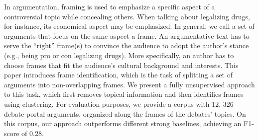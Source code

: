 In argumentation, framing is used to emphasize a specific aspect of a controversial topic while concealing others. When talking about legalizing drugs, for instance, its economical aspect may be emphasized. In general, we call a set of arguments that focus on the same aspect a frame. An argumentative text has to serve the ``right'' frame(s) to convince the audience to adopt the author's stance (e.g., being pro or con legalizing drugs). More specifically, an author has to choose frames that fit the audience's cultural background and interests.
This paper introduces frame identification, which is the task of splitting a set of arguments into non-overlapping frames. We present a fully unsupervised approach to this task, which first removes topical information and then identifies frames using clustering. For evaluation purposes, we provide a corpus with 12, 326 debate-portal arguments, organized along the frames of the debates' topics. On this corpus, our approach outperforms different strong baselines, achieving an F1-score of 0.28.